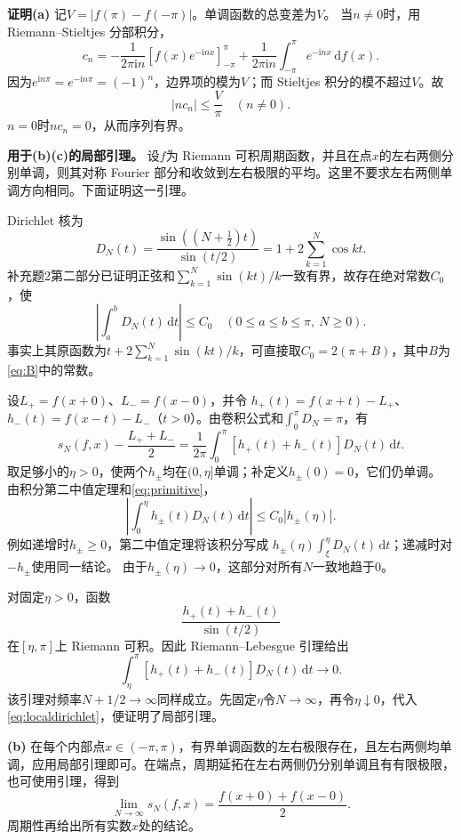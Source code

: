 \documentclass[11pt,a4paper]{ctexart}
\newcommand{\ii}{\mathrm i}
\newcommand{\dd}{\,\mathrm d}
\newcommand{\proofstart}{\par\noindent\textbf{证明}\quad}
\begin{document}
\proofstart \textbf{(a)} 记$V=|f(\pi)-f(-\pi)|$。单调函数的总变差为$V$。
当$n\ne0$时，用 Riemann--Stieltjes 分部积分，
\[
 c_n=-\frac1{2\pi\ii n}
    \left[f(x)e^{-\ii nx}\right]_{-\pi}^{\pi}
   +\frac1{2\pi\ii n}\int_{-\pi}^{\pi}e^{-\ii nx}\dd f(x).
\]
因为$e^{\ii n\pi}=e^{-\ii n\pi}=(-1)^n$，边界项的模为$V$；而 Stieltjes 积分的模不超过$V$。故
\[
 |nc_n|\le\frac{V}{\pi}\quad(n\ne0).
\]
$n=0$时$nc_n=0$，从而序列有界。

\textbf{用于(b)(c)的局部引理。}
设$f$为 Riemann 可积周期函数，并且在点$x$的左右两侧分别单调，则其对称 Fourier 部分和收敛到左右极限的平均。这里不要求左右两侧单调方向相同。下面证明这一引理。

Dirichlet 核为
\[
 D_N(t)=\frac{\sin((N+\tfrac12)t)}{\sin(t/2)}
 =1+2\sum_{k=1}^N\cos kt.
\]
补充题2第二部分已证明正弦和$\sum_{k=1}^N\sin(kt)/k$一致有界，故存在绝对常数$C_0$，使
\begin{equation}\label{eq:primitive}
 \left|\int_a^b D_N(t)\dd t\right|\le C_0
 \quad(0\le a\le b\le\pi,\ N\ge0).
\end{equation}
事实上其原函数为$t+2\sum_{k=1}^N\sin(kt)/k$，可直接取$C_0=2(\pi+B)$，其中$B$为\eqref{eq:B}中的常数。

设$L_+=f(x+0)$、$L_-=f(x-0)$，并令
$h_+(t)=f(x+t)-L_+$、$h_-(t)=f(x-t)-L_-$（$t>0$）。由卷积公式和$\int_0^\pi D_N=\pi$，有
\begin{equation}\label{eq:localdirichlet}
 s_N(f,x)-\frac{L_++L_-}{2}
 =\frac1{2\pi}\int_0^\pi[h_+(t)+h_-(t)]D_N(t)\dd t.
\end{equation}
取足够小的$\eta>0$，使两个$h_\pm$均在$(0,\eta]$单调；补定义$h_\pm(0)=0$，它们仍单调。
由积分第二中值定理和\eqref{eq:primitive}，
\[
 \left|\int_0^\eta h_\pm(t)D_N(t)\dd t\right|
 \le C_0|h_\pm(\eta)|.
\]
例如递增时$h_\pm\ge0$，第二中值定理将该积分写成
$h_\pm(\eta)\int_\xi^\eta D_N(t)\dd t$；递减时对$-h_\pm$使用同一结论。
由于$h_\pm(\eta)\to0$，这部分对所有$N$一致地趋于$0$。

对固定$\eta>0$，函数
\[
 \frac{h_+(t)+h_-(t)}{\sin(t/2)}
\]
在$[\eta,\pi]$上 Riemann 可积。因此 Riemann--Lebesgue 引理给出
\[
 \int_\eta^\pi[h_+(t)+h_-(t)]D_N(t)\dd t\longrightarrow0.
\]
该引理对频率$N+1/2\to\infty$同样成立。先固定$\eta$令$N\to\infty$，再令$\eta\downarrow0$，代入\eqref{eq:localdirichlet}，便证明了局部引理。

\textbf{(b)} 在每个内部点$x\in(-\pi,\pi)$，有界单调函数的左右极限存在，且左右两侧均单调，应用局部引理即可。在端点，周期延拓在左右两侧仍分别单调且有有限极限，也可使用引理，得到
\[
 \lim_{N\to\infty}s_N(f,x)=\frac{f(x+0)+f(x-0)}2.
\]
周期性再给出所有实数$x$处的结论。
\end{document}
